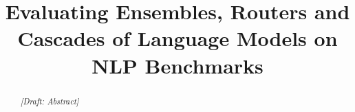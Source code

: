 \documentclass[11pt,a4paper]{article}
\title{Evaluating Ensembles, Routers and Cascades of Language Models on NLP Benchmarks}
\newcommand{\placeholder}[1]{\par\noindent\textit{[Draft: #1]}\par}
\begin{document}
\maketitle
\begin{abstract}
\placeholder{Abstract}
\end{abstract}








\clearpage


\nocite{*}


\clearpage
\appendix






\end{document}
